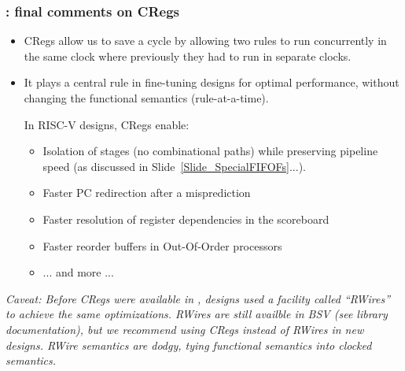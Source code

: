 \begin{frame}[fragile]
\frametitle{{\BSV}: final comments on CRegs}

\footnotesize

\begin{itemize}

 \item CRegs allow us to save a cycle by allowing two rules to run
       concurrently in the same clock where previously they had to run
       in separate clocks.

 \item It plays a central rule in fine-tuning {\BSV} designs for
       optimal performance, without changing the functional semantics
       (rule-at-a-time).

       \vspace{1ex}

       In RISC-V designs, CRegs enable:
       \begin{itemize}\footnotesize

         \item Isolation of stages (no combinational paths) while
               preserving pipeline speed (as discussed in
               Slide~\ref{Slide_SpecialFIFOFs}...).

         \item Faster PC redirection after a misprediction
         \item Faster resolution of register dependencies in the scoreboard
         \item Faster reorder buffers in Out-Of-Order processors
         \item ... and more ...
       \end{itemize}

\end{itemize}

\PAUSE{\vspace*{5ex}}

 \emph{Caveat: Before CRegs were available in {\BSV}, designs used a
       facility called ``RWires'' to achieve the same optimizations.
       RWires are still availble in BSV (see library documentation),
       but we recommend using CRegs instead of RWires in new designs.
       RWire semantics are dodgy, tying functional semantics into
       clocked semantics.}

\end{frame}







